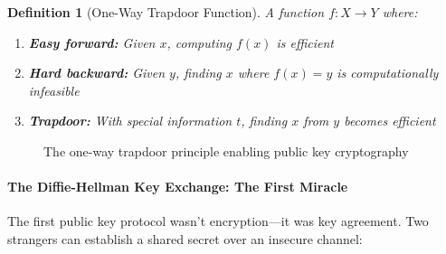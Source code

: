 \documentclass[11pt,a4paper]{article}
\newtheorem{definition}{Definition}
\begin{document}
\begin{definition}[One-Way Trapdoor Function]
A function $f: X \to Y$ where:
\begin{enumerate}
    \item \textbf{Easy forward:} Given $x$, computing $f(x)$ is efficient
    \item \textbf{Hard backward:} Given $y$, finding $x$ where $f(x) = y$ is computationally infeasible
    \item \textbf{Trapdoor:} With special information $t$, finding $x$ from $y$ becomes efficient
\end{enumerate}
\end{definition}

\begin{figure}[h]
\centering
{}
\caption{The one-way trapdoor principle enabling public key cryptography}
\end{figure}

\paragraph{The Diffie-Hellman Key Exchange: The First Miracle}

The first public key protocol wasn't encryption---it was key agreement. Two strangers can establish a shared secret over an insecure channel:
\end{document}
